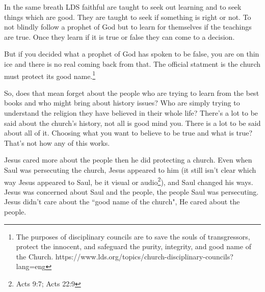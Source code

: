 In the same breath LDS faithful are taught to seek out learning and to seek things
which are good. They are taught to seek if something is right or not. To not blindly
follow a prophet of God but to learn for themselves if the teachings are true. Once
they learn if it is true or false they can come to a decision.

But if you decided what a prophet of God has spoken to be false, you are on thin ice
and there is no real coming back from that. The official statment is the church must
protect its good name.\footnote{
The purposes of disciplinary councils are to save the souls of transgressors, 
protect the innocent, and safeguard the purity, integrity, 
and good name of the Church.
https://www.lds.org/topics/church-disciplinary-councils?lang=eng
}

So, does that mean forget about the people who are trying to learn from the best
books and who might bring about history issues? Who are simply trying to understand
the religion they have believed in their whole life? There's a lot to be said about
the church's history, not all is good mind you. There is a lot to be said about all
of it. Choosing what you want to believe to be true and what is true? That's not how
any of this works.

Jesus cared more about the people then he did protecting a church. Even when Saul was
persecuting the church, Jesus appeared to him (it still isn't clear which way Jesus
appeared to Saul, be it visual or audio\footnote{Acts 9:7; Acts 22:9}), 
and Saul changed his ways. Jesus was concerned about Saul and the people, the people 
Saul was persecuting. Jesus didn't care about the ``good name of the church", He 
cared about the people.